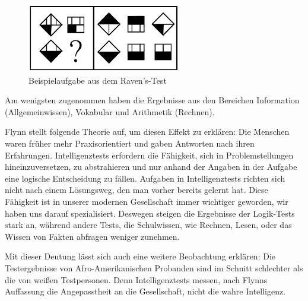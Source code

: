 \begin{figure}[H]
  \centering
  \includegraphics[width=0.6\textwidth]{img/ravens.png}
  \caption{Beispielaufgabe aus dem Raven's-Test \cite{flynn}}
  \label{fig:ravens}
\end{figure}

Am wenigsten zugenommen haben die Ergebnisse aus den Bereichen Information (Allgemeinwissen), Vokabular und Arithmetik (Rechnen).

Flynn stellt folgende Theorie auf, um diesen Effekt zu erklären:
Die Menschen waren früher mehr Praxisorientiert und gaben Antworten nach ihren Erfahrungen. Intelligenztests erfordern die Fähigkeit, sich in Problemstellungen hineinzuversetzen, zu abstrahieren und nur anhand der Angaben in der Aufgabe eine logische Entscheidung zu fällen. Aufgaben in Intelligenztests richten sich nicht nach einem Lösungsweg, den man vorher bereits gelernt hat. Diese Fähigkeit ist in unserer modernen Gesellschaft immer wichtiger geworden, wir haben uns darauf spezialisiert. Deswegen steigen die Ergebnisse der Logik-Tests stark an, während andere Tests, die Schulwissen, wie Rechnen, Lesen, oder das Wissen von Fakten abfragen weniger zunehmen. \cite{flynn}

Mit dieser Deutung lässt sich auch eine weitere Beobachtung erklären: Die Testergebnisse von Afro-Amerikanischen Probanden sind im Schnitt schlechter als die von weißen Testpersonen. Denn Intelligenztests messen, nach Flynns Auffassung die Angepasstheit an die Gesellschaft, nicht die wahre Intelligenz. \cite{flynn}
